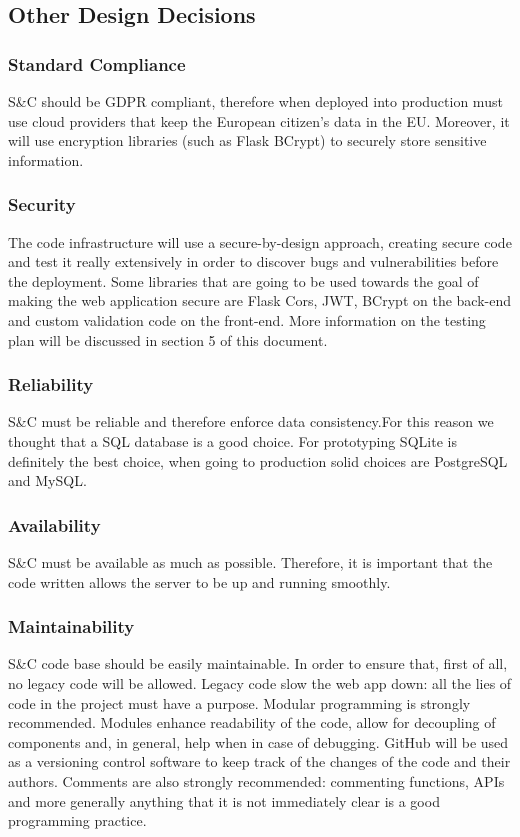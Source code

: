 \subsection{Other Design Decisions}

\subsubsection{Standard Compliance}
S\&C should be GDPR compliant, therefore when deployed into production must use cloud providers that keep the European citizen's data in the EU. Moreover, it will use encryption libraries (such as Flask BCrypt) to securely store sensitive information. 

\subsubsection{Security}
The code infrastructure will use a secure-by-design approach, creating secure code and test it really extensively in order to discover bugs and vulnerabilities before the deployment. Some libraries that are going to be used towards the goal of making the web application secure are Flask Cors, JWT, BCrypt on the back-end and custom validation code on the front-end. More information on the testing plan will be discussed in section 5 of this document.

\subsubsection{Reliability}
S\&C must be reliable and therefore enforce data consistency.For this reason we thought that a SQL database is a good choice. For prototyping SQLite is definitely the best choice, when going to production solid choices are PostgreSQL and MySQL.

\subsubsection{Availability}
S\&C must be available as much as possible. Therefore, it is important that the code written allows the server to be up and running smoothly.

\subsubsection{Maintainability}
S\&C code base should be easily maintainable. In order to ensure that, first of all, no legacy code will be allowed. Legacy code slow the web app down: all the lies of code in the project must have a purpose. Modular programming is strongly recommended. Modules enhance readability of the code, allow for decoupling of components and, in general, help when in case of debugging. GitHub will be used as a versioning control software to keep track of the changes of the code and their authors. Comments are also strongly recommended: commenting functions, APIs and more generally anything that it is not immediately clear is a good programming practice.